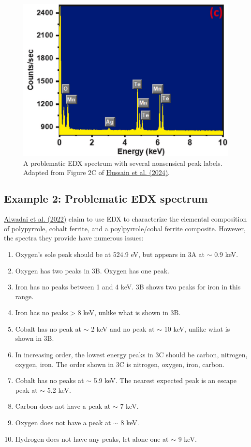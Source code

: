 \documentclass[letterpaper, 12pt]{article}
\begin{document}
\begin{figure}[h!tbp]
    \includegraphics[width=\textwidth]{img/edx/hussain_edx.png}
    \caption*{ A problematic EDX spectrum with several nonsensical peak labels. Adapted from Figure 2C of \href{https://doi.org/10.1016/j.ijhydene.2024.05.274}{Hussain et al. (2024)}.}
\end{figure}

\pagebreak

\subsection*{Example 2: Problematic EDX spectrum}

\href{https://doi.org/10.1007/s10854-022-08265-y}{Alwadai et al. (2022)} claim to use EDX to characterize the elemental composition of polypyrrole, cobalt ferrite, and a poylpyrrole/cobal ferrite composite. However, the spectra they provide have numerous issues:

\begin{enumerate}
    \setlength\itemsep{-0.5em}
    \item Oxygen's sole peak should be at 524.9 eV, but appears in 3A at $\sim$ 0.9 keV.
    \item Oxygen has two peaks in 3B. Oxygen has one peak.
    \item Iron has no peaks between 1 and 4 keV. 3B shows two peaks for iron in this range.
    \item Iron has no peaks > 8 keV, unlike what is shown in 3B.
    \item Cobalt has no peak at $\sim$ 2 keV and no peak at $\sim$ 10 keV, unlike what is shown in 3B.
    \item In increasing order, the lowest energy peaks in 3C should be carbon, nitrogen, oxygen, iron. The order shown in 3C is nitrogen, oxygen, iron, carbon.
    \item Cobalt has no peaks at $\sim$ 5.9 keV. The nearest expected peak is an escape peak at $\sim$ 5.2 keV.
    \item Carbon does not have a peak at $\sim$ 7 keV.
    \item Oxygen does not have a peak at $\sim$ 8 keV.
    \item Hydrogen does not have any peaks, let alone one at $\sim$ 9 keV.
\end{enumerate}
\end{document}
